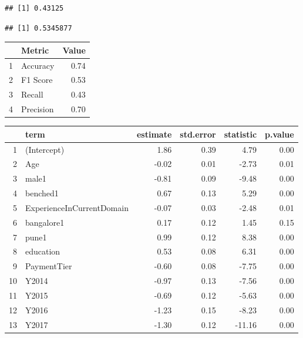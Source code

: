 \documentclass[11pt,preprint, authoryear]{elsarticle}
\let\origtable\table
\let\endorigtable\endtable
\renewenvironment{table}[1][2] {
    \expandafter\origtable\expandafter[H]
} {
    \endorigtable
}
\numberwithin{equation}{section}
\numberwithin{figure}{section}
\numberwithin{table}{section}
\begin{document}
\begin{verbatim}
## [1] 0.43125
\end{verbatim}

\begin{verbatim}
## [1] 0.5345877
\end{verbatim}

\begin{table}[H]
\centering
\begin{tabular}{rlr}
  \hline
 & Metric & Value \\ 
  \hline
1 & Accuracy & 0.74 \\ 
  2 & F1 Score & 0.53 \\ 
  3 & Recall & 0.43 \\ 
  4 & Precision & 0.70 \\ 
   \hline
\end{tabular}
\caption{Metrics for Logistic Regression \label{tab1}} 
\end{table}

\begin{table}[H]
\centering
\begin{tabular}{rlrrrr}
  \hline
 & term & estimate & std.error & statistic & p.value \\ 
  \hline
1 & (Intercept) & 1.86 & 0.39 & 4.79 & 0.00 \\ 
  2 & Age & -0.02 & 0.01 & -2.73 & 0.01 \\ 
  3 & male1 & -0.81 & 0.09 & -9.48 & 0.00 \\ 
  4 & benched1 & 0.67 & 0.13 & 5.29 & 0.00 \\ 
  5 & ExperienceInCurrentDomain & -0.07 & 0.03 & -2.48 & 0.01 \\ 
  6 & bangalore1 & 0.17 & 0.12 & 1.45 & 0.15 \\ 
  7 & pune1 & 0.99 & 0.12 & 8.38 & 0.00 \\ 
  8 & education & 0.53 & 0.08 & 6.31 & 0.00 \\ 
  9 & PaymentTier & -0.60 & 0.08 & -7.75 & 0.00 \\ 
  10 & Y2014 & -0.97 & 0.13 & -7.56 & 0.00 \\ 
  11 & Y2015 & -0.69 & 0.12 & -5.63 & 0.00 \\ 
  12 & Y2016 & -1.23 & 0.15 & -8.23 & 0.00 \\ 
  13 & Y2017 & -1.30 & 0.12 & -11.16 & 0.00 \\ 
   \hline
\end{tabular}
\caption{Logistic Regression Results \label{tab1}} 
\end{table}
\end{document}
